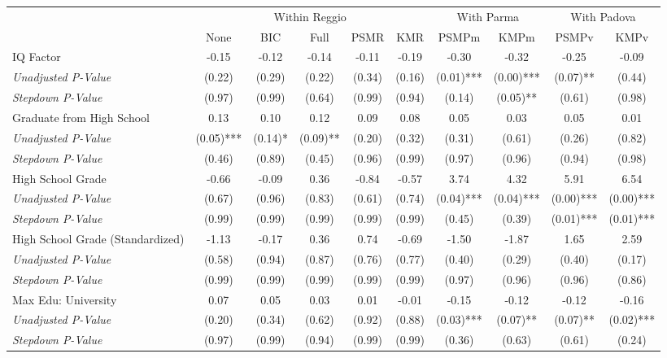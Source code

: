 \begin{tabular}{l c c c c c c c c c}
\toprule
& \multicolumn{5}{c}{Within Reggio} & \multicolumn{2}{c}{With Parma} & \multicolumn{2}{c}{With Padova} \\\cmidrule(lr){2-6} \cmidrule(lr){7-8} \cmidrule(lr){9-10}
 & None & BIC & Full & PSMR & KMR & PSMPm & KMPm & PSMPv & KMPv \\
\midrule
IQ Factor & -0.15 & -0.12 & -0.14 & -0.11 & -0.19 & -0.30 & -0.32 & -0.25 & -0.09 \\
\quad \textit{Unadjusted P-Value} & (0.22) & (0.29) & (0.22) & (0.34) & (0.16) & (0.01)*** & (0.00)*** & (0.07)** & (0.44) \\
\quad \textit{Stepdown P-Value} & (0.97) & (0.99) & (0.64) & (0.99) & (0.94) & (0.14) & (0.05)** & (0.61) & (0.98) \\
Graduate from High School & 0.13 & 0.10 & 0.12 & 0.09 & 0.08 & 0.05 & 0.03 & 0.05 & 0.01 \\
\quad \textit{Unadjusted P-Value} & (0.05)*** & (0.14)* & (0.09)** & (0.20) & (0.32) & (0.31) & (0.61) & (0.26) & (0.82) \\
\quad \textit{Stepdown P-Value} & (0.46) & (0.89) & (0.45) & (0.96) & (0.99) & (0.97) & (0.96) & (0.94) & (0.98) \\
High School Grade & -0.66 & -0.09 & 0.36 & -0.84 & -0.57 & 3.74 & 4.32 & 5.91 & 6.54 \\
\quad \textit{Unadjusted P-Value} & (0.67) & (0.96) & (0.83) & (0.61) & (0.74) & (0.04)*** & (0.04)*** & (0.00)*** & (0.00)*** \\
\quad \textit{Stepdown P-Value} & (0.99) & (0.99) & (0.99) & (0.99) & (0.99) & (0.45) & (0.39) & (0.01)*** & (0.01)*** \\
High School Grade (Standardized) & -1.13 & -0.17 & 0.36 & 0.74 & -0.69 & -1.50 & -1.87 & 1.65 & 2.59 \\
\quad \textit{Unadjusted P-Value} & (0.58) & (0.94) & (0.87) & (0.76) & (0.77) & (0.40) & (0.29) & (0.40) & (0.17) \\
\quad \textit{Stepdown P-Value} & (0.99) & (0.99) & (0.99) & (0.99) & (0.99) & (0.97) & (0.96) & (0.96) & (0.86) \\
Max Edu: University & 0.07 & 0.05 & 0.03 & 0.01 & -0.01 & -0.15 & -0.12 & -0.12 & -0.16 \\
\quad \textit{Unadjusted P-Value} & (0.20) & (0.34) & (0.62) & (0.92) & (0.88) & (0.03)*** & (0.07)** & (0.07)** & (0.02)*** \\
\quad \textit{Stepdown P-Value} & (0.97) & (0.99) & (0.94) & (0.99) & (0.99) & (0.36) & (0.63) & (0.61) & (0.24) \\

\end{tabular}
